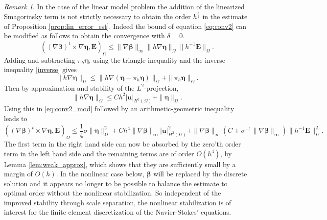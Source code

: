 \documentclass[10pt]{amsart}
\numberwithin{equation}{section}
\theoremstyle{definition}
\theoremstyle{remark}
\newtheorem{remark}[theorem]{Remark}
\renewcommand{\(}{\bigl(}
\renewcommand{\)}{\bigr)}
\newcommand{\bld}[1]{\boldsymbol{#1}}
\newcommand{\bu}{\bld{u}}
\newcommand{\bE}{\bld{E}}
\newcommand{\bldeta}{\bld{\eta}}
\newcommand{\bbeta}{{\bm \beta}}
\begin{document}
\begin{remark}
In the case of the linear model problem the addition of the
linearized Smagorinsky term is not strictly necessary to obtain the
order $h^{\frac32}$ in the estimate of Proposition
\ref{prop:lin_error_est}. Indeed the bound of equation
\eqref{eq:conv2} can be modified as follows to obtain the convergence
with $\delta=0$.
\begin{equation}\label{eq:conv2_mod}
((\nabla \bbeta)^t\times \nabla \bldeta, \bE)_\Omega \leq \|\nabla
\bbeta\|_\infty \|h \nabla \bldeta\|_\Omega \|h^{-1} \bE\|_\Omega.
\end{equation}
Adding and subtracting $\pi_h \bldeta$, using the
triangle inequality and the inverse inequality \eqref{inverse} gives
\[
\|h \nabla \bldeta\|_\Omega \leq \|h \nabla ( \bldeta - \pi_h
\bldeta)\|_\Omega+ \|\pi_h \bldeta\|_\Omega.
\]
Then by approximation and stability of the $L^2$-projection,
\[
\|h \nabla \bldeta\|_\Omega \leq C h^2 |\bu|_{H^2(\Omega)}+ \|\bldeta\|_\Omega.
\]
Using this in \eqref{eq:conv2_mod} followed by an arithmetic-geometric
inequality leads to
\[
((\nabla \bbeta)^t\times \nabla \bldeta, \bE)_\Omega \leq  \frac14 \sigma \|\bldeta\|_\Omega^2 + C h^4
\|\nabla
\bbeta\|_\infty |\bu|_{H^2(\Omega)}^2 + \|\nabla
\bbeta\|_\infty  (C + \sigma^{-1}\|\nabla
\bbeta\|_\infty) \|h^{-1}\bE\|_\Omega^2. 
\]
The first term in the right hand side can now be absorbed by the
zero'th order term in the left hand side and the remaining terms are
of order $O(h^4)$, by Lemma \ref{lem:weak_approx}, which shows that they are sufficiently small by a
margin of $O(h)$. In the nonlinear case below, $\bbeta$ will be
replaced by the discrete solution and it appears no longer to be
possible to balance the estimate to optimal order without the
nonlinear stabilization. So independent of the improved stability
through scale separation, the nonlinear stabilization is of interest
for the finite element discretization of the Navier-Stokes' equations.
\end{remark}
\end{document}
